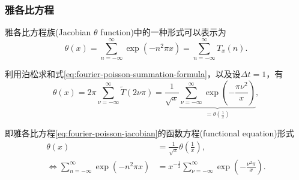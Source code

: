 \subsubsection{雅各比方程}
\label{sec:fourier-poisson-jacobian}
雅各比方程族(Jacobian $\theta$ function)中的一种形式可以表示为
\begin{equation}
  \label{eq:fourier-poisson-jacobian}
  \theta(x) = \sum_{n = - \infty}^{\infty}
  \exp \left( - n^{2} \pi x \right)
  = \sum_{n = - \infty}^{\infty} T_{x}(n).
\end{equation}

利用泊松求和式\eqref{eq:fourier-poisson-summation-formula}，以及设$\Delta t = 1$，有
\begin{equation}
\label{eq:fourier-poisson-jacobian-2}
\theta(x) = 2 \pi \sum_{\nu = - \infty}^{\infty} \widetilde{T} \left( 2 \nu \pi \right)
= \frac{1}{\sqrt{x}}
\underbrace{
\sum_{\nu = - \infty}^{\infty}
\exp \left(
 - \frac{\pi \nu^{2}}{x}
\right)
}_{= \theta \left( \frac{1}{x} \right)},
\end{equation}

即雅各比方程\eqref{eq:fourier-poisson-jacobian}的函数方程(functional equation)形式
\begin{equation}
\label{eq:fourier-poisson-jacobian-equiv}
\begin{split}
  \theta \left( x \right) & = \frac{1}{\sqrt{x}} \theta \left( \frac{1}{x} \right),\\
  \Leftrightarrow \sum_{n = - \infty}^{\infty}
  \exp \left( - n^{2} \pi x \right) & = x^{-\frac{1}{2}} \sum_{\nu = - \infty}^{\infty} \exp \left( - \frac{\nu^{2} \pi }{x} \right).
\end{split}
\end{equation}

